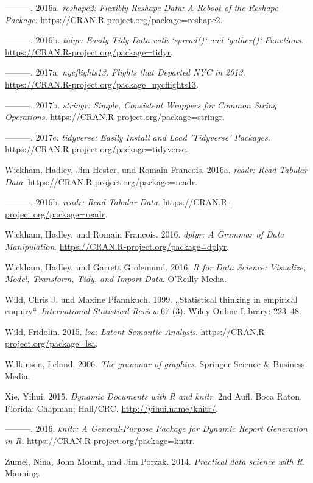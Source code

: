 \documentclass[12pt,ngerman,]{book}
\begin{document}
\hypertarget{ref-R-reshape2}{}
---------. 2016a. \emph{reshape2: Flexibly Reshape Data: A Reboot of the
Reshape Package}. \url{https://CRAN.R-project.org/package=reshape2}.

\hypertarget{ref-R-tidyr}{}
---------. 2016b. \emph{tidyr: Easily Tidy Data with `spread()` and
`gather()` Functions}. \url{https://CRAN.R-project.org/package=tidyr}.

\hypertarget{ref-R-nycflights13}{}
---------. 2017a. \emph{nycflights13: Flights that Departed NYC in
2013}. \url{https://CRAN.R-project.org/package=nycflights13}.

\hypertarget{ref-R-stringr}{}
---------. 2017b. \emph{stringr: Simple, Consistent Wrappers for Common
String Operations}. \url{https://CRAN.R-project.org/package=stringr}.

\hypertarget{ref-R-tidyverse}{}
---------. 2017c. \emph{tidyverse: Easily Install and Load 'Tidyverse'
Packages}. \url{https://CRAN.R-project.org/package=tidyverse}.

\hypertarget{ref-readr}{}
Wickham, Hadley, Jim Hester, und Romain Francois. 2016a. \emph{readr:
Read Tabular Data}. \url{https://CRAN.R-project.org/package=readr}.

\hypertarget{ref-R-readr}{}
---------. 2016b. \emph{readr: Read Tabular Data}.
\url{https://CRAN.R-project.org/package=readr}.

\hypertarget{ref-R-dplyr}{}
Wickham, Hadley, und Romain Francois. 2016. \emph{dplyr: A Grammar of
Data Manipulation}. \url{https://CRAN.R-project.org/package=dplyr}.

\hypertarget{ref-r4ds}{}
Wickham, Hadley, und Garrett Grolemund. 2016. \emph{R for Data Science:
Visualize, Model, Transform, Tidy, and Import Data}. O'Reilly Media.

\hypertarget{ref-wild1999statistical}{}
Wild, Chris J, und Maxine Pfannkuch. 1999. „Statistical thinking in
empirical enquiry``. \emph{International Statistical Review} 67 (3).
Wiley Online Library: 223--48.

\hypertarget{ref-R-lsa}{}
Wild, Fridolin. 2015. \emph{lsa: Latent Semantic Analysis}.
\url{https://CRAN.R-project.org/package=lsa}.

\hypertarget{ref-wilkinson2006grammar}{}
Wilkinson, Leland. 2006. \emph{The grammar of graphics}. Springer
Science \& Business Media.

\hypertarget{ref-xie2015}{}
Xie, Yihui. 2015. \emph{Dynamic Documents with R and knitr}. 2nd Aufl.
Boca Raton, Florida: Chapman; Hall/CRC. \url{http://yihui.name/knitr/}.

\hypertarget{ref-R-knitr}{}
---------. 2016. \emph{knitr: A General-Purpose Package for Dynamic
Report Generation in R}. \url{https://CRAN.R-project.org/package=knitr}.

\hypertarget{ref-zumel2014practical}{}
Zumel, Nina, John Mount, und Jim Porzak. 2014. \emph{Practical data
science with R}. Manning.

\printindex

\backmatter
\end{document}
